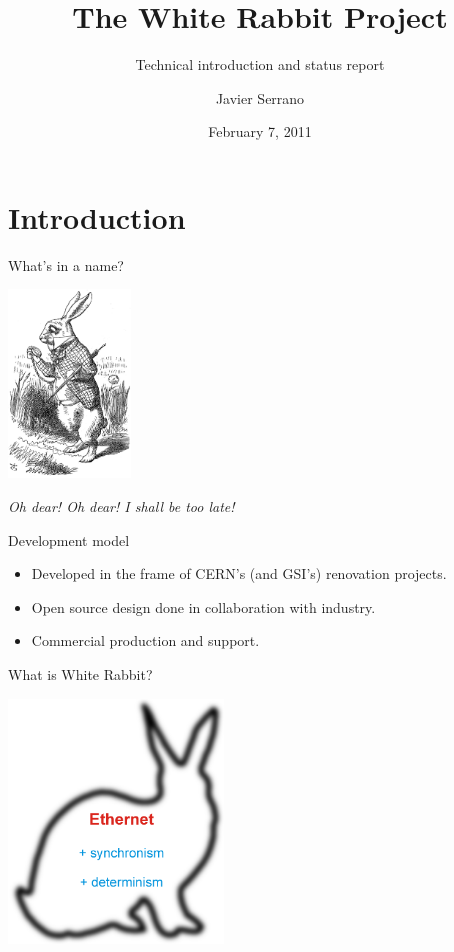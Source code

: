 \documentclass[compress,red]{beamer}
\title[WR Project Status\hspace{2em}\insertframenumber/
\inserttotalframenumber]{The White Rabbit Project}
\subtitle{Technical introduction and status report}
\author{Javier Serrano}
\date{February 7, 2011}
\institute%
{
  BE-CO Hardware and Timing section\\
  CERN, Geneva, Switzerland
 }
\begin{document}
\frame{\titlepage}


\section{Introduction}
\begin{frame}{What's in a name?}
\begin{center}
\includegraphics[height=5cm]{../../figures/misc/Alice-wr.jpg}

\textit{Oh dear! Oh dear! I shall be too late!}\\
\end{center}
\end{frame}


\begin{frame}{Development model}
\begin{itemize}
\item Developed in the frame of CERN's (and GSI's) renovation projects.
\item Open source design done in collaboration with industry.
\item Commercial production and support.
\end{itemize}
\end{frame}


\begin{frame}{What is White Rabbit?}
\begin{center}
\includegraphics[height=6.5cm]{../../figures/misc/rabbit.pdf}
\end{center}
\end{frame}
\end{document}
